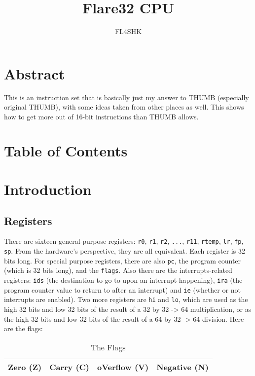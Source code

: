 \documentclass{article}
\title{Flare32 CPU}
\author{FL4SHK}
\makeatletter
\renewcommand\tableofcontents{%
    \@starttoc{toc}%
}
\makeatother
\begin{document}
	\maketitle
	\newpage


	\doublespacing
	\section{Abstract}
	\setcounter{section}{-1}
	This is an instruction set that is basically just my answer to THUMB
	(especially original THUMB), with some ideas taken from other places as
	well.  This shows how to get more out of 16-bit instructions than THUMB
	allows.

	\newpage
	\singlespacing
	\section{Table of Contents}
	\tableofcontents
	\newpage

	\doublespacing
	\section{Introduction}
	\subsection{Registers}
	There are sixteen general-purpose registers:  \texttt{r0}, \texttt{r1},
	\texttt{r2}, \texttt{...}, \texttt{r11}, \texttt{rtemp}, \texttt{lr},
	\texttt{fp}, \texttt{sp}.  From the hardware's perspective, they are
	all equivalent.  Each register is 32 bits long.  For special purpose
	registers, there are also \texttt{pc}, the program counter (which is 32
	bits long), and the \texttt{flags}.  Also there are the
	interrupts-related registers: \texttt{ids} (the destination to go to
	upon an interrupt happening), \texttt{ira} (the program counter value
	to return to after an interrupt) and \texttt{ie} (whether or not
	interrupts are enabled).  Two more registers are \texttt{hi} and
	\texttt{lo}, which are used as the high 32 bits and low 32 bits of the
	result of a 32 by 32 -> 64 multiplication, or as the high 32 bits and
	low 32 bits of the result of a 64 by 32 -> 64 division.  Here are the
	flags:

	\begin{table}[H]
		\begin{center}
			\caption{The Flags}
			\label{tab:flags}
			\begin{tabular}{|c|c|c|c|}
				\hline
				Zero (Z) & Carry (C) & oVerflow (V) & Negative (N)\\
				\hline
			\end{tabular}
		\end{center}
	\end{table}
\end{document}
